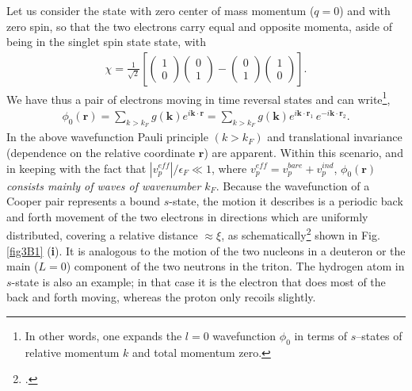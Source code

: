 Let us consider the state with zero center of mass momentum ($q=0$) and with zero spin, so that the two electrons carry  equal and opposite momenta, aside of being in the singlet spin state state, with
\begin{align}\label{eq3B2}
\chi=\frac{1}{\sqrt{2}}\left[
\left(\begin{array}{c}
1\\ 
0
\end{array} \right)
\left(\begin{array}{c}
0\\ 
1
\end{array} \right)-
\left(\begin{array}{c}
0\\ 
1
\end{array} \right)
\left(\begin{array}{c}
1\\ 
0
\end{array} \right)
\right].
\end{align}
 We have thus a pair of electrons moving in time reversal states and can write\footnote{In other words, one expands the $l=0$ wavefunction $\phi_0$ in terms of $s$--states of relative momentum $k$ and total momentum zero.},
\begin{align}\label{eq3B3}
\phi_0(\mathbf r)=\sum_{k>k_F}g(\mathbf k)e^{i\mathbf k\cdot\mathbf r}=\sum_{k>k_F}g(\mathbf k)e^{i\mathbf k\cdot\mathbf r_1}\,e^{-i\mathbf k\cdot\mathbf r_2}.
\end{align}
In the above wavefunction Pauli principle $(k>k_F)$ and translational invariance (dependence on the relative coordinate $\mathbf r$) are apparent. 
Within this scenario, and in keeping with the fact that $|v^{eff}_p|/\epsilon_F\ll1$, where $v_p^{eff}=v^{bare}_p+v^{ind}_p$,  $\phi_0(\mathbf r)$ \textit{consists mainly of waves of wavenumber $k_F$}. Because the wavefunction of a Cooper pair represents a bound $s$-state, the motion it describes is a periodic back and forth movement of the two electrons in  directions which are uniformly distributed, covering a relative distance $\approx\xi$, as schematically\footnote{\cite{Weisskopf:81}.} shown in Fig. \ref{fig3B1} (\textbf{i}). It is analogous to the motion of the two nucleons in a deuteron or the main ($L=0$) component of the two neutrons in the triton. The hydrogen atom in $s$-state is also an example; in that case it is the electron that does most of the back and forth moving, whereas the proton only recoils slightly.

